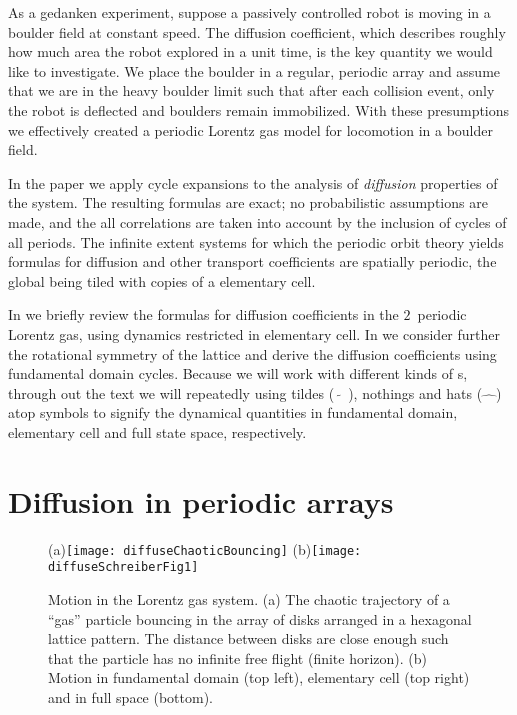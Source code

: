 \documentclass[aps,pre,
                showpacs,
                twocolumn,
                groupedaddress,
                floatfix]{revtex4-1}
\begin{document}
As a gedanken experiment, suppose a passively controlled robot is moving in a
boulder field at constant speed. The diffusion coefficient, which describes
roughly how much area the robot explored in a unit time, is the key quantity we
would like to investigate. We place the boulder in a regular, periodic array and
assume that we are in the heavy boulder limit such that after each collision
event, only the robot is deflected and boulders remain immobilized. With these
presumptions we effectively created a periodic Lorentz gas model for
locomotion in a boulder field.

In the paper we apply cycle expansions to the analysis of {\em diffusion}
properties of the system. The resulting formulas are exact; no probabilistic
assumptions are made, and the all correlations are taken into account by the
inclusion of cycles of all periods. The infinite extent systems for which the
periodic orbit theory yields formulas for diffusion and other transport
coefficients are spatially periodic, the global {\statesp} being tiled with
copies of a elementary cell.

In  we briefly review the formulas for diffusion
coefficients in the $2$\dmn\ periodic Lorentz gas, using dynamics restricted in
elementary cell. In we consider further the
rotational symmetry of the lattice and derive the diffusion coefficients using
fundamental domain cycles. Because we will work with different kinds of \statesp
s, through out the text we will repeatedly using tildes ($\tilde{\quad}$),
nothings and hats ($\hat{\quad}$) atop symbols to signify the dynamical
quantities in fundamental domain, elementary cell and full state space,
respectively.

\section{Diffusion in periodic arrays}
\label{s-DiffPerArr}

\begin{figure}[htbp]
  \begin{center}
    (a)\texttt{[image: diffuseChaoticBouncing]}
    (b)\texttt{[image: diffuseSchreiberFig1]}
  \end{center}
  \caption[]{\label{fig-chaoticBouncing} Motion in the Lorentz gas system. (a)
  The chaotic trajectory of a ``gas'' particle bouncing in the array of disks
  arranged in a hexagonal lattice pattern. The distance between disks are close
  enough such that the particle has no infinite free flight (finite horizon).
  (b) Motion in fundamental domain (top left), elementary cell (top right) and
  in full space (bottom). }
\end{figure}
\end{document}
